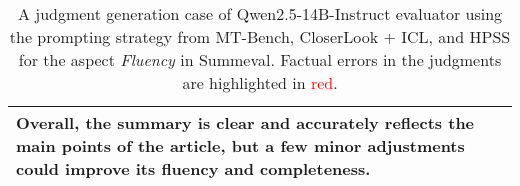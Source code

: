 \begin{table*}[!ht]
\begin{tabular}{p{55pt}p{365pt}}
    Overall, the summary is clear and accurately reflects the main points of the article, but a few minor adjustments could improve its fluency and completeness. \\
    \bottomrule
    \end{tabular}
    \vspace{-2mm}
    \caption{A judgment generation case of Qwen2.5-14B-Instruct evaluator using the prompting strategy from MT-Bench, CloserLook + ICL, and HPSS for the aspect \textit{Fluency} in Summeval. Factual errors in the judgments are highlighted in \textcolor{red}{red}.}
    \label{tab:judgement_case_1}
\end{table*}
